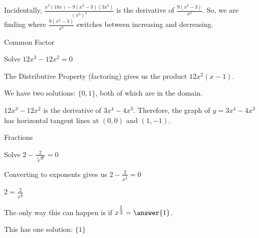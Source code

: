 \documentclass{ximera}
\begin{document}
Incidentally, $\frac{x^3 (18x) - 9(x^2-3)(3x^2)}{(x^3)^2}$ is the derivative of $\frac{9(x^2-3)}{x^3}$.  So, we are finding where $\frac{9(x^2-3)}{x^3}$ switches between increasing and decreasing.











\begin{example}  Common Factor


Solve $12 x^3 - 12 x^2 = 0 $



\begin{explanation}


The Distributive Property (factoring) gives us the product $12 x^2 (x-1)$.




We have two solutions: $\{ 0, 1  \}$, both of which are in the domain.


\end{explanation}


$12 x^3 - 12 x^2$ is the derivative of $3x^4 - 4x^3$.  Therefore, the graph of $y = 3x^4 - 4x^3$ has horizontal tangent lines at $(0, 0)$ and $(1, -1)$.





\begin{center}
\end{center}


\end{example}





















\begin{example}  Fractions


Solve $2 - \frac{2}{\sqrt[3]{x}} = 0$



\begin{explanation}


Converting to exponents gives us $2 - \frac{2}{x^{\tfrac{1}{3}}} = 0$


$2 = \frac{2}{x^{\tfrac{1}{3}}}$

The only way this can happen is if $x^{\tfrac{1}{3}} = \answer{1}$.

This has one solution: $\{  1  \}$





\end{explanation}


\end{example}
\end{document}
